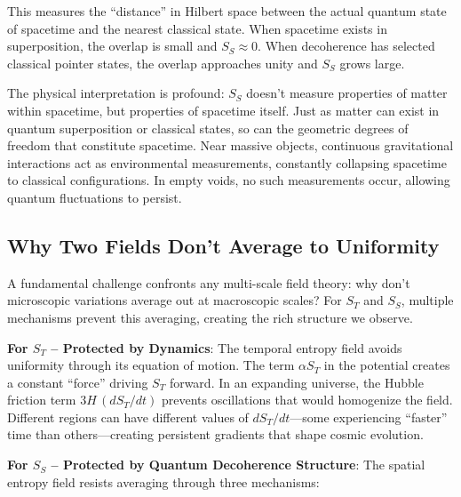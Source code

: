 \documentclass[12pt]{article}
\begin{document}
This measures the ``distance'' in Hilbert space between the actual quantum state of spacetime and the nearest classical state. When spacetime exists in superposition, the overlap is small and $S_S \approx 0$. When decoherence has selected classical pointer states, the overlap approaches unity and $S_S$ grows large.

The physical interpretation is profound: $S_S$ doesn't measure properties of matter within spacetime, but properties of spacetime itself. Just as matter can exist in quantum superposition or classical states, so can the geometric degrees of freedom that constitute spacetime. Near massive objects, continuous gravitational interactions act as environmental measurements, constantly collapsing spacetime to classical configurations. In empty voids, no such measurements occur, allowing quantum fluctuations to persist.

\subsection{Why Two Fields Don't Average to Uniformity}

A fundamental challenge confronts any multi-scale field theory: why don't microscopic variations average out at macroscopic scales? For $S_T$ and $S_S$, multiple mechanisms prevent this averaging, creating the rich structure we observe.

\textbf{For $S_T$ -- Protected by Dynamics}: The temporal entropy field avoids uniformity through its equation of motion. The term $\alpha S_T$ in the potential creates a constant ``force'' driving $S_T$ forward. In an expanding universe, the Hubble friction term $3H\, (dS_T/dt)$ prevents oscillations that would homogenize the field. Different regions can have different values of $dS_T/dt$---some experiencing ``faster'' time than others---creating persistent gradients that shape cosmic evolution.

\textbf{For $S_S$ -- Protected by Quantum Decoherence Structure}: The spatial entropy field resists averaging through three mechanisms:
\end{document}

